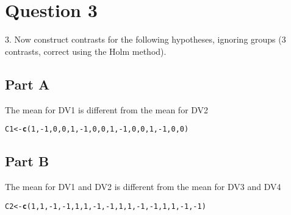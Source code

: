 \documentclass{article}\usepackage[]{graphicx}\usepackage[]{color}
\makeatletter
\newcommand{\hlnum}[1]{\textcolor[rgb]{0.686,0.059,0.569}{#1}}%
\newcommand{\hlopt}[1]{\textcolor[rgb]{0,0,0}{#1}}%
\newcommand{\hlstd}[1]{\textcolor[rgb]{0.345,0.345,0.345}{#1}}%
\newcommand{\hlkwb}[1]{\textcolor[rgb]{0.69,0.353,0.396}{#1}}%
\newcommand{\hlkwd}[1]{\textcolor[rgb]{0.737,0.353,0.396}{\textbf{#1}}}%
\newenvironment{kframe}{%
 \def\at@end@of@kframe{}%
 \ifinner\ifhmode%
  \def\at@end@of@kframe{\end{minipage}}%
  \begin{minipage}{\columnwidth}%
 \fi\fi%
 \def\FrameCommand##1{\hskip\@totalleftmargin \hskip-\fboxsep
 \colorbox{shadecolor}{##1}\hskip-\fboxsep
     \hskip-\linewidth \hskip-\@totalleftmargin \hskip\columnwidth}%
 \MakeFramed {\advance\hsize-\width
   \@totalleftmargin\z@ \linewidth\hsize
   \@setminipage}}%
 {\par\unskip\endMakeFramed%
 \at@end@of@kframe}
\newenvironment{knitrout}{}{} %
\makeatother
\begin{document}
\section{Question 3}
3. Now construct contrasts for the following hypotheses, ignoring groups (3 contrasts, correct using the Holm method).

\subsection{Part A}
The mean for DV1 is different from the mean for DV2
\begin{knitrout}
\color{fgcolor}\begin{kframe}
\begin{alltt}
\hlstd{C1} \hlkwb{<-} \hlkwd{c}\hlstd{(}\hlnum{1}\hlstd{,}\hlopt{-}\hlnum{1}\hlstd{,}\hlnum{0}\hlstd{,}\hlnum{0}\hlstd{,} \hlnum{1}\hlstd{,}\hlopt{-}\hlnum{1}\hlstd{,}\hlnum{0}\hlstd{,}\hlnum{0}\hlstd{,} \hlnum{1}\hlstd{,}\hlopt{-}\hlnum{1}\hlstd{,}\hlnum{0}\hlstd{,}\hlnum{0}\hlstd{,} \hlnum{1}\hlstd{,}\hlopt{-}\hlnum{1}\hlstd{,}\hlnum{0}\hlstd{,}\hlnum{0}\hlstd{)}
\end{alltt}
\end{kframe}
\end{knitrout}

\subsection{Part B}
The mean for DV1 and DV2 is different from the mean for DV3 and DV4 
\begin{knitrout}
\color{fgcolor}\begin{kframe}
\begin{alltt}
\hlstd{C2} \hlkwb{<-} \hlkwd{c}\hlstd{(}\hlnum{1}\hlstd{,}\hlnum{1}\hlstd{,}\hlopt{-}\hlnum{1}\hlstd{,}\hlopt{-}\hlnum{1}\hlstd{,} \hlnum{1}\hlstd{,}\hlnum{1}\hlstd{,}\hlopt{-}\hlnum{1}\hlstd{,}\hlopt{-}\hlnum{1}\hlstd{,} \hlnum{1}\hlstd{,}\hlnum{1}\hlstd{,}\hlopt{-}\hlnum{1}\hlstd{,}\hlopt{-}\hlnum{1}\hlstd{,} \hlnum{1}\hlstd{,}\hlnum{1}\hlstd{,}\hlopt{-}\hlnum{1}\hlstd{,}\hlopt{-}\hlnum{1}\hlstd{)}
\end{alltt}
\end{kframe}
\end{knitrout}
\end{document}
